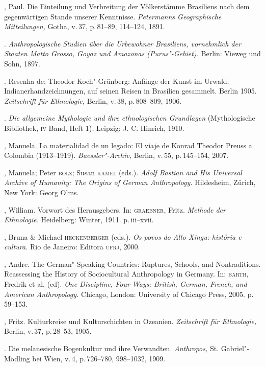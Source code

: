 \begin{bibliohedra}
 , Paul. Die Einteilung und Verbreitung der Völkerstämme
 Brasiliens nach dem gegenwärtigen Stande unserer Kenntnisse.
 \textit{Petermanns Geographische Mitteilungen,} Gotha, v.\,37, p.\,81--89,
 114--124, 1891.

 \titidem. \textit{Anthropologische Studien über die
 Urbewohner Brasiliens, vornehmlich der Staaten Matto Grosso, Goyaz und
 Amazonas (Purus"-Gebiet).} Berlin: Vieweg und Sohn, 1897.

 \titidem. Resenha de: Theodor Koch"-Grünberg: Anfänge der
 Kunst im Urwald: Indianerhandzeichnungen, auf seinen Reisen in Brasilien
 gesammelt. Berlin 1905. \textit{Zeitschrift für Ethnologie,} Berlin, v.\,38, p.\,808--809, 1906.

 \titidem. \textit{Die allgemeine Mythologie und ihre
 ethnologischen Grundlagen} (Mythologische Bibliothek, \textsc{iv} Band, Heft
 1)\textit{.} Leipzig: J. C. Hinrich, 1910.

 , Manuela. La materialidad de un legado: El viaje de Konrad
 Theodor Preuss a Colombia (1913--1919). \textit{Baessler"-Archiv,} Berlin,
 v.\,55, p.\,145--154, 2007.

 , Manuela; Peter \textsc{bolz}; Susan \textsc{kamel} (eds.). \textit{Adolf Bastian
 and His Universal Archive of Humanity: The Origins of German
 Anthropology.} Hildesheim, Zürich, New York: Georg Olms.

 , William. Vorwort des Herausgebers. In: \textsc{graebner}, Fritz.
 \textit{Methode der Ethnologie.} Heidelberg: Winter, 1911. p.\,iii--xvii.

 , Bruna \& Michael \textsc{heckenberger} (eds.). \textit{Os povos do
 Alto Xingu: história e cultura.} Rio de Janeiro: Editora \textsc{ufrj}, 2000.

 , Andre. The German"-Speaking Countries: Ruptures, Schools, and
 Nontraditions. Reassessing the History of Sociocultural Anthropology in
 Germany. In: \textsc{barth}, Fredrik et al. (ed). \textit{One Discipline, Four
 Ways: British, German, French, and American Anthropology.} Chicago,
 London: University of Chicago Press, 2005. p.\,59--153.

 , Fritz. Kulturkreise und Kulturschichten in Ozeanien.
 \textit{Zeitschrift für Ethnologie,} Berlin, v.\,37, p.\,28--53, 1905.

 \titidem. Die melanesische Bogenkultur und ihre Verwandten.
 \textit{Anthropos,} St. Gabriel"-Mödling bei Wien, v.\,4, p.\,726--780,
 998--1032, 1909.


\end{bibliohedra}

